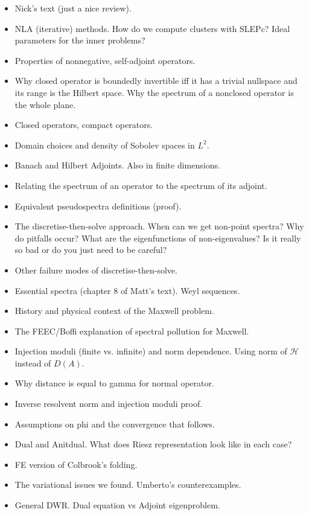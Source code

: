 \documentclass[12pt,a4paper]{article}
\begin{document}
\begin{itemize}
    \item Nick's text (just a nice review).
    \item NLA (iterative) methods. How do we compute clusters with SLEPc? Ideal parameters for the inner problems?
    \item Properties of nonnegative, self-adjoint operators.
    \item Why closed operator is boundedly invertible iff it has a trivial nullspace and its range is the Hilbert space. Why the spectrum of a nonclosed operator is the whole plane. 
    \item Closed operators, compact operators. 
    \item Domain choices and density of Sobolev spaces in $L^2.$
    \item Banach and Hilbert Adjoints. Also in finite dimensions.
    \item Relating the spectrum of an operator to the spectrum of its adjoint. 
    \item Equivalent pseudospectra definitions (proof). 
    \item The discretise-then-solve approach. When can we get non-point spectra? Why do pitfalls occur? What are the eigenfunctions of non-eigenvalues? Is it really so bad or do you just need to be careful?
    \item Other failure modes of discretise-then-solve.
    \item Essential spectra (chapter 8 of Matt's text). Weyl sequences. 
    \item History and physical context of the Maxwell problem.
    \item The FEEC/Boffi explanation of spectral pollution for Maxwell. 
    \item Injection moduli (finite vs. infinite) and norm dependence. Using norm of $\mathcal{H}$ instead of $D(A).$
    \item Why distance is equal to gamma for normal operator. 
    \item Inverse resolvent norm and injection moduli proof. 
    \item Assumptions on phi and the convergence that follows. 
    \item Dual and Anitdual. What does Riesz representation look like in each case?
    \item FE version of Colbrook's folding.
    \item The variational issues we found. Umberto's counterexamples. 
    \item General DWR. Dual equation vs Adjoint eigenproblem.

\end{itemize}
\end{document}
